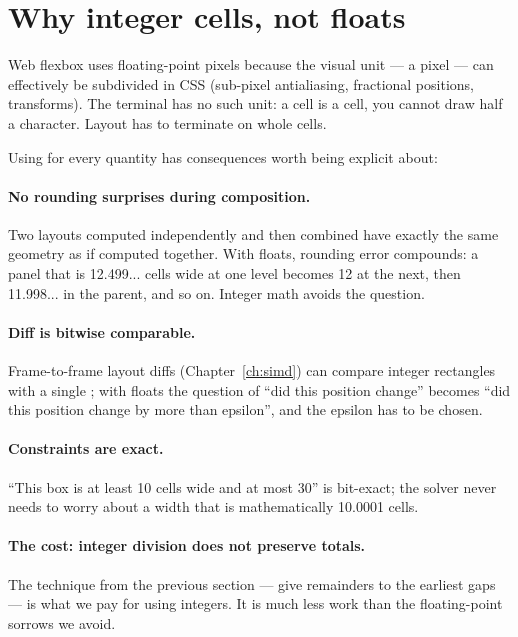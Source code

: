 \section{Why integer cells, not floats}
\label{sec:layout:integer-math}

Web flexbox uses floating-point pixels because the visual unit ---
a pixel --- can effectively be subdivided in CSS (sub-pixel
antialiasing, fractional positions, transforms). The terminal has
no such unit: a cell is a cell, you cannot draw half a character.
Layout has to terminate on whole cells.

Using  for every quantity has consequences worth
being explicit about:

\paragraph{No rounding surprises during composition.} Two layouts
computed independently and then combined have exactly the same
geometry as if computed together. With floats, rounding error
compounds: a panel that is 12.499... cells wide at one level
becomes 12 at the next, then 11.998... in the parent, and so on.
Integer math avoids the question.

\paragraph{Diff is bitwise comparable.} Frame-to-frame layout
diffs (Chapter~\ref{ch:simd}) can compare integer rectangles
with a single \code{==}; with floats the question of ``did this
position change'' becomes ``did this position change by more than
epsilon'', and the epsilon has to be chosen.

\paragraph{Constraints are exact.} ``This box is at least 10 cells
wide and at most 30'' is bit-exact; the solver never needs to
worry about a width that is mathematically 10.0001 cells.

\paragraph{The cost: integer division does not preserve totals.}
The technique from the previous section --- give remainders to the
earliest gaps --- is what we pay for using integers. It is much
less work than the floating-point sorrows we avoid.

